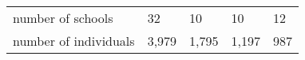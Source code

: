 \begin{table}[ht]
\begin{adjustbox}{max width=0.75\textwidth}
\begin{tabular}{lllll}
			\hline
			number of schools & 32 & 10 &10 & 12 \\
			number of individuals               & 3,979    & 1,795   & 1,197   & 987   \\ \hline\hline
		\end{tabular}%
	\end{adjustbox}
\label{tb:table1}
\end{table}